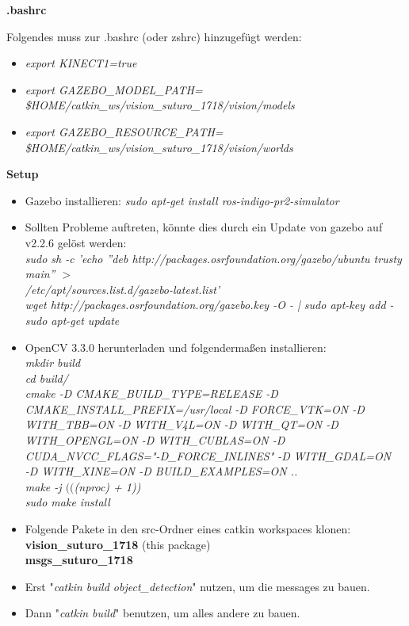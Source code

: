 \documentclass{suturo}
\begin{document}
\textbf{.bashrc}

Folgendes muss zur .bashrc (oder zshrc) hinzugefügt werden:
\begin{itemize}
\item \textit{export KINECT1=true}
\item \textit{export GAZEBO\_MODEL\_PATH= \$HOME/catkin\_ws/vision\_suturo\_1718/vision/models}
\item \textit{export GAZEBO\_RESOURCE\_PATH= \$HOME/catkin\_ws/vision\_suturo\_1718/vision/worlds}
\end{itemize}

\textbf{Setup}

\begin{itemize}
\item Gazebo installieren: \textit{sudo apt-get install ros-indigo-pr2-simulator}

\item Sollten Probleme auftreten, könnte dies durch ein Update von gazebo auf v2.2.6 gelöst werden:
\\
\textit{sudo sh -c 'echo ''deb http://packages.osrfoundation.org/gazebo/ubuntu trusty main'' $>$ \\ 
/etc/apt/sources.list.d/gazebo-latest.list'}
\\
\textit{wget http://packages.osrfoundation.org/gazebo.key -O - | sudo apt-key add -}
\\
\textit{sudo apt-get update}


\item OpenCV 3.3.0 herunterladen und folgendermaßen installieren: \\

\textit{mkdir build} \\
\textit{cd build/} \\
\textit{cmake -D CMAKE\_BUILD\_TYPE=RELEASE -D \\ 
CMAKE\_INSTALL\_PREFIX=/usr/local -D FORCE\_VTK=ON -D \\ 
WITH\_TBB=ON -D WITH\_V4L=ON -D WITH\_QT=ON -D \\ 
WITH\_OPENGL=ON -D WITH\_CUBLAS=ON -D \\ 
CUDA\_NVCC\_FLAGS="-D\_FORCE\_INLINES" -D WITH\_GDAL=ON \\ 
-D WITH\_XINE=ON -D BUILD\_EXAMPLES=ON ..} \\
\textit{make -j $(($(nproc) + 1))} \\
\textit{sudo make install} \\



\item Folgende Pakete in den src-Ordner eines catkin workspaces klonen:\\
        \textbf{vision\_suturo\_1718} (this package) \\
        \textbf{msgs\_suturo\_1718}
\item Erst "\textit{catkin build object\_detection}" nutzen, um die messages zu bauen.
\item Dann "\textit{catkin build}" benutzen, um alles andere zu bauen.

\end{itemize}
\end{document}

